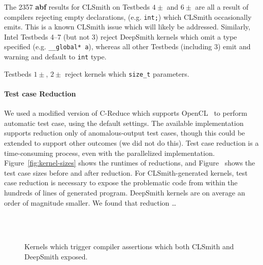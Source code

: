 The 2357 \textbf{abf} results for CLSmith on Testbeds $4\pm$ and $6\pm$ are all a result of compilers rejecting empty declarations, (e.g. \texttt{int;}) which CLSmith occasionally emits. This is a known CLSmith issue which will likely be addressed.
Similarly, Intel Testbeds 4--7 (but not 3) reject DeepSmith kernels which omit a type specified (e.g. \texttt{\_\_global* a}), whereas all other Testbeds (including 3) emit and warning and default to \texttt{int} type.

Testbeds $1\pm$, $2\pm$ reject kernels which \texttt{size\_t} parameters.


\paragraph{Test case Reduction} We used a modified version of C-Reduce which supports OpenCL~\cite{Pflanzer2016} to perform automatic test case, using the default settings. The available implementation supports reduction only of anomalous-output test cases, though this could be extended to support other outcomes (we did not do this). Test case reduction is a time-consuming process, even with the parallelized implementation. Figure~\ref{fig:kernel-sizes} shows the runtimes of reductions, and Figure~ shows the test case sizes before and after reduction. For CLSmith-generated kernels, test case reduction is necessary to expose the problematic code from within the hundreds of lines of generated program. DeepSmith kernels are on average an order of magnitude smaller. We found that reduction \ldots


\begin{figure}
  \centering %
  \\%
  \\%
  \caption{Kernels which trigger compiler assertions which both CLSmith and DeepSmith exposed.}%
  \label{lst:clsmith-compiler-assertions}%
\end{figure}


